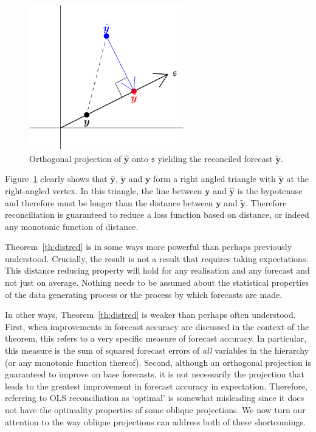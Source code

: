 \documentclass[12pt]{article}
\theoremstyle{definition}
\begin{document}
\begin{figure}[!hbt]
  \centering \includegraphics[width=0.6\textwidth]{Figs/orth_pointforerec_schematic.pdf}
  \caption{Orthogonal projection of $\hat{\bm{y}}$ onto $\mathfrak{s}$ yielding the reconciled forecast $\tilde{\bm{y}}$.}\label{fig:Schematic_OLSRecon}
\end{figure}

Figure~\ref{fig:Schematic_OLSRecon} clearly shows that $\hat{\bm{y}}$, $\tilde{\bm{y}}$ and $\bm{y}$ form a right angled triangle with $\tilde{\bm{y}}$ at the right-angled vertex. In this triangle, the line between $\bm{y}$ and $\hat{\bm{y}}$ is the hypotenuse and therefore must be longer than the distance between $\bm{y}$ and $\tilde{\bm{y}}$. Therefore reconciliation is guaranteed to reduce {\color{blue} a loss function based on distance, or indeed any monotonic function of distance.}

Theorem~\ref{th:distred} is in some ways more powerful than perhaps previously understood. Crucially, the result is not a result that requires taking expectations. This distance reducing property will hold for any realisation and any forecast and not just on average. Nothing needs to be assumed about the statistical properties of the data generating process or the process by which forecasts are made.

In other ways, Theorem~\ref{th:distred} is weaker than perhaps often understood. First, when improvements in forecast accuracy are discussed in the context of the theorem, this refers to a very specific measure of forecast accuracy. In particular, this measure is the sum of squared forecast errors of \emph{all} variables in the hierarchy {\color{blue}(or any monotonic function thereof)}.  Second, although an orthogonal projection is guaranteed to improve on base forecasts, it is not necessarily the projection that leads to the greatest improvement in forecast accuracy in expectation. Therefore, referring to OLS reconciliation as `optimal' is somewhat misleading since it does not have the optimality properties of some oblique projections. {\color{blue} We now turn our attention to the way oblique projections can address both of these shortcomings.}
\end{document}

